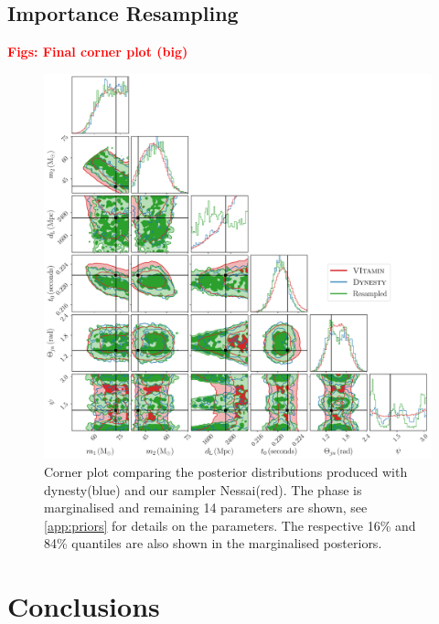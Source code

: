\documentclass[aps,superscriptaddress,twocolumn,nopreprintnumbers,floatfix,groupedaddress]{revtex4-1}
\newcommand{\nessai}{{\sc Nessai}\xspace}
\newcommand{\dynesty}{{\sc dynesty}\xspace}
\newcommand{\doublefigwidth}{17.2cm}
\begin{document}
\subsection{Importance Resampling}


\textbf{\textcolor{red}{Figs: Final corner plot (big)}}

\begin{figure}[h]
	\centering
	\includegraphics[width=\doublefigwidth]{figs/resample_corner.pdf}
	\caption{Corner plot comparing the posterior distributions produced with \dynesty (blue) and our sampler \nessai (red). The phase is marginalised and remaining 14 parameters are shown, see \cref{app:priors} for details on the parameters. The respective 16\% and 84\% quantiles are also shown in the \protect{} marginalised posteriors.}
	\label{fig:final_corner}
\end{figure}



\section{Conclusions}\label{conc}
\end{document}
